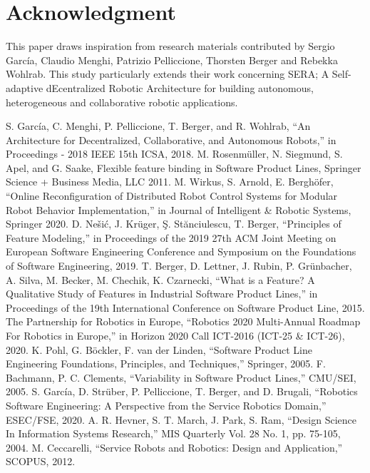 \documentclass[conference]{IEEEtran}
\begin{document}
\section*{Acknowledgment}
This paper draws inspiration from research materials contributed by Sergio Garc\'{i}a, Claudio Menghi, Patrizio Pelliccione, Thorsten Berger and Rebekka Wohlrab. This study particularly extends their work concerning SERA; A Self-adaptive dEcentralized Robotic Architecture for building autonomous, heterogeneous and collaborative robotic applications.


\begin{thebibliography}{00}
 S. Garc\'{i}a, C. Menghi, P. Pelliccione, T. Berger, and R. Wohlrab, ``An Architecture for Decentralized, Collaborative, and Autonomous Robots,'' in Proceedings - 2018 IEEE 15th ICSA, 2018.
 M. Rosenmüller, N. Siegmund, S. Apel, and G. Saake, Flexible feature binding in Software Product Lines, Springer Science + Business Media, LLC 2011.
 M. Wirkus, S. Arnold, E. Berghöfer, ``Online Reconfiguration of Distributed Robot Control Systems
for Modular Robot Behavior Implementation,'' in Journal of Intelligent \& Robotic Systems, Springer 2020.
 D. Nešić, J. Krüger, Ş. Stănciulescu, T. Berger, ``Principles of Feature Modeling,'' in  Proceedings of the 2019 27th ACM Joint Meeting on European Software Engineering Conference and Symposium on the Foundations of Software Engineering, 2019.
 T. Berger, D. Lettner, J. Rubin, P. Grünbacher, A. Silva, M. Becker,  M. Chechik, K. Czarnecki, ``What is a Feature? A Qualitative Study of Features in Industrial Software Product Lines,'' in  Proceedings of the 19th International Conference on Software Product Line, 2015.
 The Partnership for Robotics in Europe, ``Robotics 2020 Multi-Annual Roadmap For Robotics in Europe,'' in  Horizon 2020 Call ICT-2016 (ICT-25 \& ICT-26), 2020.
 K. Pohl, G. Böckler, F. van der Linden, ``Software Product Line Engineering Foundations, Principles, and Techniques,'' Springer, 2005.
 F. Bachmann, P. C. Clements, ``Variability in Software Product Lines,'' CMU/SEI, 2005.
 S. Garc\'{i}a, D. Strüber, P. Pelliccione, T. Berger, and D. Brugali, ``Robotics Software Engineering: A Perspective from the Service
Robotics Domain,''  ESEC/FSE, 2020.
 A. R. Hevner, S. T. March, J. Park, S. Ram, ``Design Science In Information Systems Research,'' MIS Quarterly Vol. 28 No. 1, pp. 75-105, 2004.
 M. Ceccarelli, ``Service Robots and Robotics: Design and Application,'' SCOPUS, 2012.

\end{thebibliography}
\end{document}
